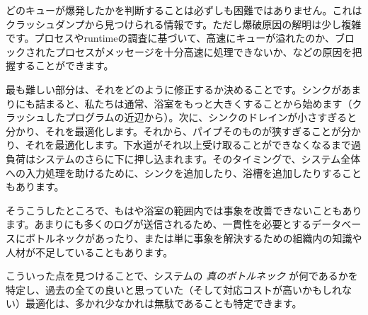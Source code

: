 どのキューが爆発したかを判断することは必ずしも困難ではありません。これはクラッシュダンプから見つけられる情報です。ただし爆破原因の解明は少し複雑です。プロセスやruntimeの調査に基づいて、高速にキューが溢れたのか、ブロックされたプロセスがメッセージを十分高速に処理できないか、などの原因を把握することができます。

最も難しい部分は、それをどのように修正するか決めることです。シンクがあまりにも詰まると、私たちは通常、浴室をもっと大きくすることから始めます（クラッシュしたプログラムの近辺から）。次に、シンクのドレインが小さすぎると分かり、それを最適化します。それから、パイプそのものが狭すぎることが分かり、それを最適化します。下水道がそれ以上受け取ることができなくなるまで過負荷はシステムのさらに下に押し込まれます。そのタイミングで、システム全体への入力処理を助けるために、シンクを追加したり、浴槽を追加したりすることもあります。

そうこうしたところで、もはや浴室の範囲内では事象を改善できないこともあります。あまりにも多くのログが送信されるため、一貫性を必要とするデータベースにボトルネックがあったり、または単に事象を解決するための組織内の知識や人材が不足していることもあります。

こういった点を見つけることで、システムの \emph{真のボトルネック} が何であるかを特定し、過去の全ての良いと思っていた（そして対応コストが高いかもしれない）最適化は、多かれ少なかれは無駄であることも特定できます。


